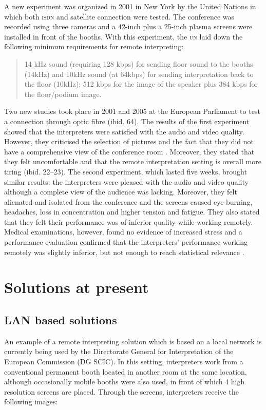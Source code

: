 \documentclass[output=paper]{langsci/langscibook}
\begin{document}
A new experiment was organized in 2001 in New York by the United Nations in which both \textsc{isdn} and satellite connection were tested. The conference was recorded using three cameras and a 42-inch plus a 25-inch plasma screens were installed in front of the booths. With this experiment, the \textsc{un} laid down the following minimum requirements for remote interpreting:

\begin{quote}
14 kHz sound (requiring 128 kbps) for sending floor sound to the booths (14kHz) and 10kHz sound (at 64kbps) for sending interpretation back to the floor (10kHz); 512 kbps for the image of the speaker plus 384 kbps for the floor/podium image. \citep[63]{Mouzourakis2006}
\end{quote}

Two new studies took place in 2001 and 2005 at the European Parliament to test a connection through optic fibre (ibid. 64). The results of the first experiment showed that the interpreters were satisfied with the audio and video quality. However, they criticised the selection of pictures and the fact that they did not have a comprehensive view of the conference room \citep[19--21]{Europarl2001}. Moreover, they stated that they felt uncomfortable and that the remote interpretation setting is overall more tiring (ibid. 22--23). The second experiment, which lasted five weeks, brought similar results: the interpreters were pleased with the audio and video quality although a complete view of the audience was lacking. Moreover, they felt alienated and isolated from the conference and the screens caused eye-burning, headaches, loss in concentration and higher tension and fatigue. They also stated that they felt their performance was of inferior quality while working remotely. Medical examinations, however, found no evidence of increased stress and a performance evaluation confirmed that the interpreters’ performance working remotely was slightly inferior, but not enough to reach statistical relevance \citep[225--243]{Roziner2010}.

\section{Solutions at present}
\label{sec:ziegler:04}
\subsection{LAN based solutions} 
\label{sub:ziegler:4.1}
An example of a remote interpreting solution which is based on a local network is currently being used by the Directorate General for Interpretation of the European Commission (\textsc{DG SCIC}). In this setting, interpreters work from a conventional permanent booth located in another room at the same location, although occasionally mobile booths were also used, in front of which 4 high resolution screens are placed. Through the screens, interpreters receive the following images:
\end{document}
